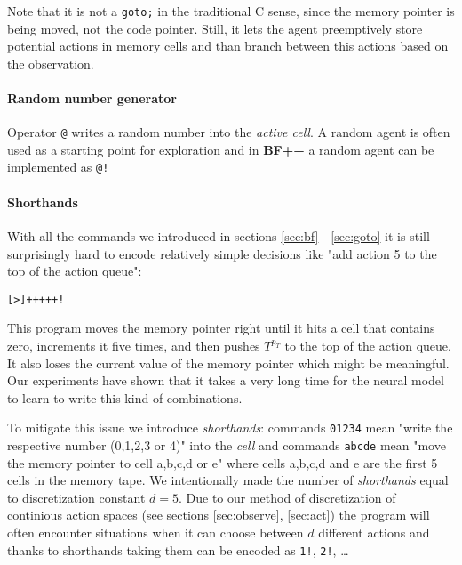 Note that it is not a \texttt{goto;} in the traditional C sense, since the memory pointer is being moved, not the code pointer.
Still, it lets the agent preemptively store potential actions in memory cells and than branch between this actions based on the observation.

\paragraph{Random number generator}
\label{sec:random}

Operator \texttt{@} writes a random number into the \textit{active cell}.
A random agent is often used as a starting point for exploration and in \textbf{BF++} a random agent can be implemented as \verb|@!|

\paragraph{Shorthands}
\label{sec:shorthands}

With all the commands we introduced in sections \ref{sec:bf} - \ref{sec:goto} it is still surprisingly hard to encode relatively simple decisions like "add action 5 to the top of the action queue":

\begin{center}
\begin{lstlisting}
[>]+++++!
\end{lstlisting}
\end{center}

This program moves the memory pointer right until it hits a cell that contains zero, increments it five times, and then pushes $T^{p_T}$ to the top of the action queue. It also loses the current value of the memory pointer which might be meaningful. Our experiments have shown that it takes a very long time for the neural model to learn to write this kind of combinations.

To mitigate this issue we introduce \textit{shorthands}: commands \texttt{01234} mean "write the respective number (0,1,2,3 or 4)" into the \textit{cell} and commands \texttt{abcde} mean "move the memory pointer to cell a,b,c,d or e" where cells a,b,c,d and e are the first 5 cells in the memory tape.
We intentionally made the number of \textit{shorthands} equal to discretization constant $d=5$.
Due to our method of discretization of continious action spaces (see sections \ref{sec:observe}, \ref{sec:act}) the program will often encounter situations when it can choose between $d$ different actions and thanks to shorthands taking them can be encoded as \texttt{1!}, \texttt{2!}, \dots

